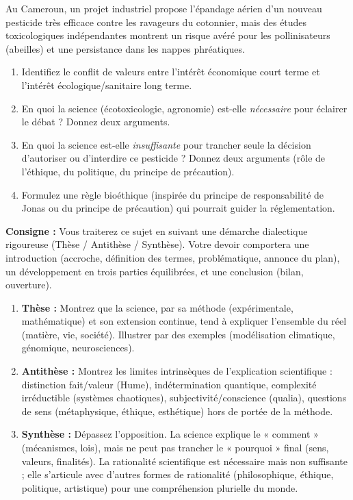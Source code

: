 \documentclass[11pt]{article}
\newcommand{\cle}[1]{{\popxbold\color{popdark}#1}}
\newcounter{popsec}
\newcounter{popsub}
\newcommand{\courssub}[1]{%
  \stepcounter{popsub}%
  \par\vspace{9pt}\noindent{\popxbold\fontsize{11.5}{13}\selectfont\color{popink}{\color{poporange}\thepopsec.\thepopsub}\hspace{6pt}#1}\par\nopagebreak\vspace{4pt}
}
\begin{document}
\begin{exercice}
Au Cameroun, un projet industriel propose l'épandage aérien d'un nouveau pesticide très efficace contre les ravageurs du cotonnier, mais des études toxicologiques indépendantes montrent un risque avéré pour les pollinisateurs (abeilles) et une persistance dans les nappes phréatiques.
\begin{enumerate}
    \item Identifiez le \cle{conflit de valeurs} entre l'intérêt économique court terme et l'intérêt écologique/sanitaire long terme.
    \item En quoi la \cle{science} (écotoxicologie, agronomie) est-elle \emph{nécessaire} pour éclairer le débat ? Donnez deux arguments.
    \item En quoi la science est-elle \emph{insuffisante} pour trancher seule la décision d'autoriser ou d'interdire ce pesticide ? Donnez deux arguments (rôle de l'éthique, du politique, du principe de précaution).
    \item Formulez une \cle{règle bioéthique} (inspirée du principe de responsabilité de Jonas ou du principe de précaution) qui pourrait guider la réglementation.
\end{enumerate}
\end{exercice}

\courssub{Je me prépare au Bac}

\begin{exercice}
\textbf{Consigne :} Vous traiterez ce sujet en suivant une démarche dialectique rigoureuse (Thèse / Antithèse / Synthèse). Votre devoir comportera une introduction (accroche, définition des termes, problématique, annonce du plan), un développement en trois parties équilibrées, et une conclusion (bilan, ouverture).
\begin{enumerate}
    \item \textbf{Thèse :} Montrez que la science, par sa méthode (expérimentale, mathématique) et son extension continue, tend à expliquer l'ensemble du réel (matière, vie, société). Illustrer par des exemples (modélisation climatique, génomique, neurosciences).
    \item \textbf{Antithèse :} Montrez les limites intrinsèques de l'explication scientifique : distinction fait/valeur (Hume), indétermination quantique, complexité irréductible (systèmes chaotiques), subjectivité/conscience (qualia), questions de sens (métaphysique, éthique, esthétique) hors de portée de la méthode.
    \item \textbf{Synthèse :} Dépassez l'opposition. La science explique le « comment » (mécanismes, lois), mais ne peut pas trancher le « pourquoi » final (sens, valeurs, finalités). La rationalité scientifique est nécessaire mais non suffisante ; elle s'articule avec d'autres formes de rationalité (philosophique, éthique, politique, artistique) pour une compréhension plurielle du monde.
\end{enumerate}
\end{exercice}
\end{document}
